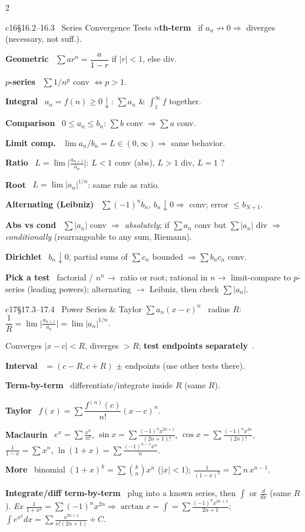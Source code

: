 \documentclass[10pt]{extarticle}
\newcommand{\h}[1]{{\bfseries #1}\ }
\newcommand{\key}[1]{\colorbox{hl}{$#1$}}
\begin{document}
\begin{multicols}{2}
\begin{tbox}{c16}{§16.2--16.3 \ Series Convergence Tests}
\h{$n$th-term} if $a_n\!\not\to\!0\Rightarrow$ diverges (necessary, not suff.).\par
\h{Geometric} $\sum ar^{n}=\dfrac{a}{1-r}$ if $|r|<1$, else div.\par
\h{$p$-series} $\sum 1/n^{p}$ conv $\iff p>1$.\par
\h{Integral} $a_n=f(n){\ge}0\!\downarrow$: $\sum a_n$ \& $\int_1^\infty f$ together.\par
\h{Comparison} $0\le a_n\le b_n$: $\sum b$ conv $\Rightarrow\sum a$ conv.\par
\h{Limit comp.} $\lim a_n/b_n=L\in(0,\infty)\Rightarrow$ same behavior.\par
\h{Ratio} $L=\lim\big|\tfrac{a_{n+1}}{a_n}\big|$: \key{L<1} conv (abs), $L>1$ div, $L{=}1$ ?\par
\h{Root} $L=\lim|a_n|^{1/n}$: same rule as ratio.\par
\h{Alternating (Leibniz)} $\sum(-1)^n b_n$, $b_n\!\downarrow 0\Rightarrow$ conv; error $\le b_{N+1}$.\par
\h{Abs vs cond} $\sum|a_n|$ conv $\Rightarrow$ \emph{absolutely}; if $\sum a_n$ conv but $\sum|a_n|$ div $\Rightarrow$ \emph{conditionally} (rearrangeable to any sum, Riemann).\par
\h{Dirichlet} $b_n\!\downarrow0$, partial sums of $\sum c_n$ bounded $\Rightarrow\sum b_nc_n$ conv.\par
\h{Pick a test} factorial / $n^n\to$ ratio or root; rational in $n\to$ limit-compare to $p$-series (leading powers); alternating $\to$ Leibniz, then check $\sum|a_n|$.
\end{tbox}

\begin{tbox}{c17}{§17.3--17.4 \ Power Series \& Taylor}
\h{$\sum a_n(x-c)^n$} radius $R$: $\dfrac1R=\lim\big|\tfrac{a_{n+1}}{a_n}\big|=\lim|a_n|^{1/n}$.\par
Converges $|x-c|<R$, diverges $>R$; \h{test endpoints separately}.\par
\h{Interval} $=(c-R,c+R)$ $\pm$ endpoints (use other tests there).\par
\h{Term-by-term} differentiate/integrate inside $R$ (same $R$).\par
\h{Taylor} $f(x)=\sum \dfrac{f^{(n)}(c)}{n!}(x-c)^n$.\par
\h{Maclaurin} $e^x{=}\sum\tfrac{x^n}{n!}$, $\sin x{=}\sum\tfrac{(-1)^nx^{2n+1}}{(2n+1)!}$, $\cos x{=}\sum\tfrac{(-1)^nx^{2n}}{(2n)!}$, $\tfrac1{1-x}{=}\sum x^n$, $\ln(1{+}x){=}\sum\tfrac{(-1)^{n-1}x^n}{n}$.\par
\h{More} binomial $(1{+}x)^k{=}\sum\binom{k}{n}x^n$ ($|x|{<}1$);\;\; $\tfrac1{(1-x)^2}{=}\sum n\,x^{n-1}$.\par
\h{Integrate/diff term-by-term} plug into a known series, then $\int$ or $\tfrac{d}{dx}$ (same $R$). \emph{Ex} $\tfrac1{1+x^2}{=}\sum(-1)^nx^{2n}\Rightarrow\arctan x{=}\!\int{=}\sum\tfrac{(-1)^nx^{2n+1}}{2n+1}$; \;$\int e^{x^2}dx{=}\sum\tfrac{x^{2n+1}}{n!(2n+1)}{+}C$.
\end{tbox}


\end{multicols}
\end{document}
